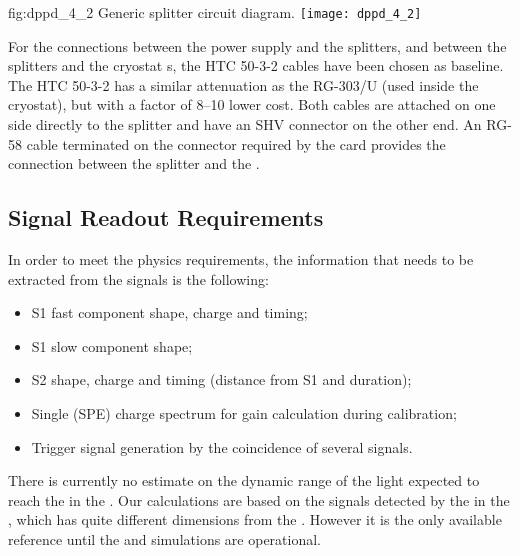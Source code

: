 \begin{dunefigure}{fig:dppd_4_2}
{Generic splitter circuit diagram.}
\texttt{[image: dppd\_4\_2]}
\end{dunefigure}

For the connections between the  power supply and the splitters, and between the splitters and the cryostat \fdth{}s, the HTC 50-3-2 cables have been chosen as baseline. The HTC 50-3-2 has a similar attenuation %
as the RG-303/U (used inside the cryostat), but with a factor of \numrange{8}{10} lower cost. Both cables are attached on one side directly to the  splitter and have an SHV connector on the other end. An RG-58 cable %
terminated on the connector required by the  card provides the connection between the splitter and the .

\subsection{Signal Readout Requirements}
\label{sec:fddp-pd-4.3}

In order to meet the physics requirements, the information that needs to be extracted from the  signals is the following:

\begin{itemize}
\item S1 fast component shape, charge and timing;
\item S1 slow component shape;
\item S2 shape, charge and timing (distance from S1 and duration);
\item Single \phel (SPE) charge spectrum for gain calculation during  calibration;
\item Trigger signal generation by the coincidence of several  signals.
\end{itemize}

There is currently no estimate on the dynamic range of the light expected to reach the  in the . Our calculations are based on the signals detected by the  in the , %
which has quite different dimensions from the . However it is the only available reference %
until the  and simulations are operational.

